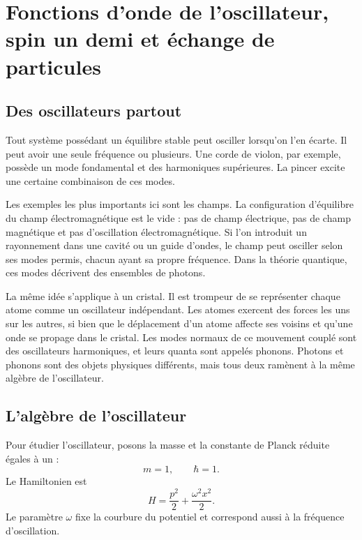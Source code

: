 \chapter{Fonctions d’onde de l’oscillateur, spin un demi et échange de particules}

\section{Des oscillateurs partout}

Tout système possédant un équilibre stable peut osciller lorsqu’on l’en écarte. Il peut avoir une seule fréquence ou plusieurs. Une corde de violon, par exemple, possède un mode fondamental et des harmoniques supérieures. La pincer excite une certaine combinaison de ces modes.

Les exemples les plus importants ici sont les champs. La configuration d’équilibre du champ électromagnétique est le vide : pas de champ électrique, pas de champ magnétique et pas d’oscillation électromagnétique. Si l’on introduit un rayonnement dans une cavité ou un guide d’ondes, le champ peut osciller selon ses modes permis, chacun ayant sa propre fréquence. Dans la théorie quantique, ces modes décrivent des ensembles de photons.

La même idée s’applique à un cristal. Il est trompeur de se représenter chaque atome comme un oscillateur indépendant. Les atomes exercent des forces les uns sur les autres, si bien que le déplacement d’un atome affecte ses voisins et qu’une onde se propage dans le cristal. Les modes normaux de ce mouvement couplé sont des oscillateurs harmoniques, et leurs quanta sont appelés phonons. Photons et phonons sont des objets physiques différents, mais tous deux ramènent à la même algèbre de l’oscillateur.

\section{L’algèbre de l’oscillateur}

Pour étudier l’oscillateur, posons la masse et la constante de Planck réduite égales à un :
\[
m=1,\qquad \hbar=1.
\]
Le Hamiltonien est
\begin{equation}
H=\frac{p^{2}}{2}+\frac{\omega^{2}x^{2}}{2}.
\end{equation}
Le paramètre \(\omega\) fixe la courbure du potentiel et correspond aussi à la fréquence d’oscillation.

